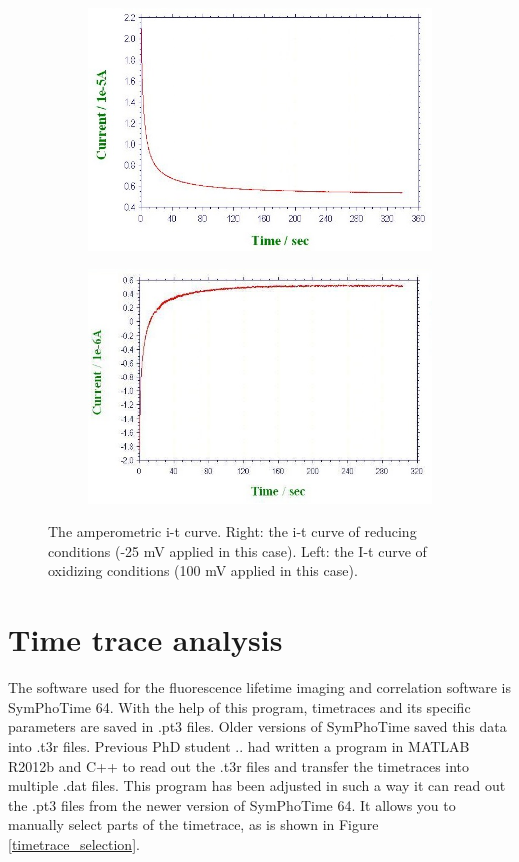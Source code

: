 \documentclass[twoside,single]{lion-msc}
\begin{document}
\begin{figure}[ht!]
\begin{subfigure}{.5\textwidth}
  \centering
  \includegraphics[width= \textwidth]{it25mV}

  \label{}
\end{subfigure}%
\begin{subfigure}{.5\textwidth}
  \centering
  \includegraphics[width=.95 \linewidth]{it100mV}
  \label{}
\end{subfigure}
\caption{The amperometric i-t curve.  Right: the i-t curve of reducing conditions (-25 mV applied in this case). Left: the I-t curve of oxidizing conditions (100 mV applied in this case).}
\label{it_curves}
\end{figure}


\section*{Time trace analysis}
The software used for the fluorescence lifetime imaging and correlation software is SymPhoTime 64. With the help of this program, timetraces and its specific parameters are saved in .pt3 files. Older versions of SymPhoTime saved this data into .t3r files. Previous PhD student .. had written a program in MATLAB R2012b and C++ to read out the .t3r files and transfer the timetraces into multiple .dat files. This program has been adjusted in such a way it can read out the .pt3 files from the newer version of SymPhoTime 64. It allows you to manually select parts of the timetrace, as is shown in Figure \ref{timetrace_selection}.
\end{document}
